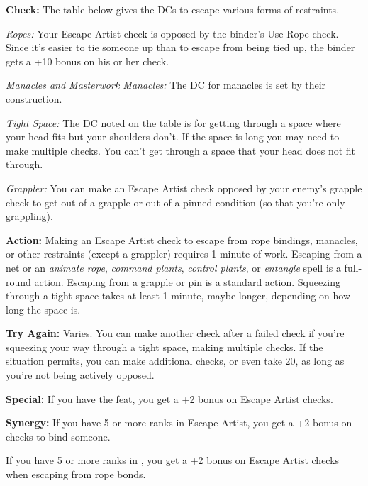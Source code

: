 \textbf{Check:} The table below gives the DCs to escape various forms of restraints.

\textit{Ropes:} Your Escape Artist check is opposed by the binder's Use Rope check. Since it's easier to tie someone up than to escape from being tied up, the binder gets a +10 bonus on his or her check.

\textit{Manacles and Masterwork Manacles:} The DC for manacles is set by their construction.

\textit{Tight Space:} The DC noted on the table is for getting through a space where your head fits but your shoulders don't. If the space is long you may need to make multiple checks. You can't get through a space that your head does not fit through.

\textit{Grappler:} You can make an Escape Artist check opposed by your enemy's grapple check to get out of a grapple or out of a pinned condition (so that you're only grappling).


\textbf{Action:} Making an Escape Artist check to escape from rope bindings, manacles, or other restraints (except a grappler) requires 1 minute of work. Escaping from a net or an \emph{animate rope}, \emph{command plants}, \emph{control plants}, or \emph{entangle} spell is a full-round action. Escaping from a grapple or pin is a standard action. Squeezing through a tight space takes at least 1 minute, maybe longer, depending on how long the space is.

\textbf{Try Again:} Varies. You can make another check after a failed check if you're squeezing your way through a tight space, making multiple checks. If the situation permits, you can make additional checks, or even take 20, as long as you're not being actively opposed.

\textbf{Special:} If you have the  feat, you get a +2 bonus on Escape Artist checks.

\textbf{Synergy:} If you have 5 or more ranks in Escape Artist, you get a +2 bonus on  checks to bind someone.

If you have 5 or more ranks in , you get a +2 bonus on Escape Artist checks when escaping from rope bonds.